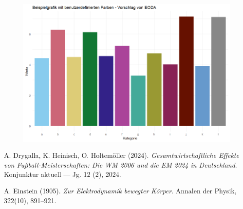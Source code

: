 \documentclass{article}
\begin{document}
\begin{figure}
  \centering
  \includegraphics[width=\linewidth]{figures/EODA_cols_plot.png}
\end{figure} 


\begin{thebibliography}{9}

  A. Drygalla, K. Heinisch, O. Holtemöller (2024). 
  \textit{Gesamtwirtschaftliche Effekte von Fußball-Meisterschaften: Die WM 2006 und die EM 2024 in Deutschland}. 
  Konjunktur aktuell — Jg. 12 (2), 2024.


 A. Einstein (1905). 
 \textit{Zur Elektrodynamik bewegter Körper}. 
 Annalen der Physik, 322(10), 891--921.

\end{thebibliography}
\end{document}
